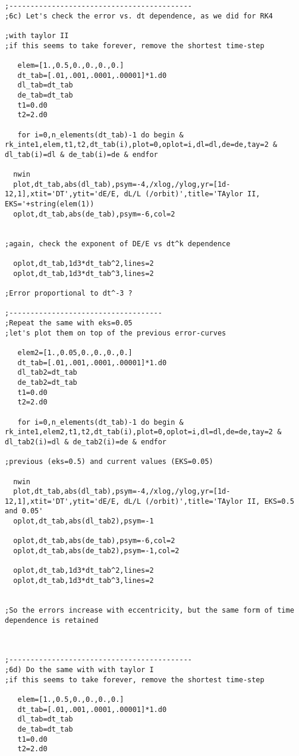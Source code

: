 \documentclass[12pt,landscape]{article}
\begin{document}
\begin{verbatim}
;-------------------------------------------
;6c) Let's check the error vs. dt dependence, as we did for RK4

;with taylor II
;if this seems to take forever, remove the shortest time-step

   elem=[1.,0.5,0.,0.,0.,0.]
   dt_tab=[.01,.001,.0001,.00001]*1.d0
   dl_tab=dt_tab
   de_tab=dt_tab
   t1=0.d0
   t2=2.d0

   for i=0,n_elements(dt_tab)-1 do begin &  rk_inte1,elem,t1,t2,dt_tab(i),plot=0,oplot=i,dl=dl,de=de,tay=2 & dl_tab(i)=dl & de_tab(i)=de & endfor

  nwin
  plot,dt_tab,abs(dl_tab),psym=-4,/xlog,/ylog,yr=[1d-12,1],xtit='DT',ytit='dE/E, dL/L (/orbit)',title='TAylor II, EKS='+string(elem(1))
  oplot,dt_tab,abs(de_tab),psym=-6,col=2


;again, check the exponent of DE/E vs dt^k dependence

  oplot,dt_tab,1d3*dt_tab^2,lines=2
  oplot,dt_tab,1d3*dt_tab^3,lines=2

;Error proportional to dt^-3 ?  

;------------------------------------
;Repeat the same with eks=0.05
;let's plot them on top of the previous error-curves

   elem2=[1.,0.05,0.,0.,0.,0.]
   dt_tab=[.01,.001,.0001,.00001]*1.d0
   dl_tab2=dt_tab
   de_tab2=dt_tab
   t1=0.d0
   t2=2.d0

   for i=0,n_elements(dt_tab)-1 do begin &  rk_inte1,elem2,t1,t2,dt_tab(i),plot=0,oplot=i,dl=dl,de=de,tay=2 & dl_tab2(i)=dl & de_tab2(i)=de & endfor

;previous (eks=0.5) and current values (EKS=0.05)

  nwin
  plot,dt_tab,abs(dl_tab),psym=-4,/xlog,/ylog,yr=[1d-12,1],xtit='DT',ytit='dE/E, dL/L (/orbit)',title='TAylor II, EKS=0.5 and 0.05'
  oplot,dt_tab,abs(dl_tab2),psym=-1

  oplot,dt_tab,abs(de_tab),psym=-6,col=2
  oplot,dt_tab,abs(de_tab2),psym=-1,col=2

  oplot,dt_tab,1d3*dt_tab^2,lines=2
  oplot,dt_tab,1d3*dt_tab^3,lines=2


;So the errors increase with eccentricity, but the same form of time dependence is retained



;-------------------------------------------
;6d) Do the same with with taylor I
;if this seems to take forever, remove the shortest time-step

   elem=[1.,0.5,0.,0.,0.,0.]
   dt_tab=[.01,.001,.0001,.00001]*1.d0
   dl_tab=dt_tab
   de_tab=dt_tab
   t1=0.d0
   t2=2.d0


\end{verbatim}
\end{document}
